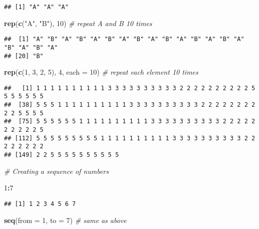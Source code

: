 \documentclass[
]{article}
\newenvironment{Shaded}{\begin{snugshade}}{\end{snugshade}}
\newcommand{\AttributeTok}[1]{\textcolor[rgb]{0.13,0.29,0.53}{#1}}
\newcommand{\CommentTok}[1]{\textcolor[rgb]{0.56,0.35,0.01}{\textit{#1}}}
\newcommand{\DecValTok}[1]{\textcolor[rgb]{0.00,0.00,0.81}{#1}}
\newcommand{\FunctionTok}[1]{\textcolor[rgb]{0.13,0.29,0.53}{\textbf{#1}}}
\newcommand{\NormalTok}[1]{#1}
\newcommand{\SpecialCharTok}[1]{\textcolor[rgb]{0.81,0.36,0.00}{\textbf{#1}}}
\newcommand{\StringTok}[1]{\textcolor[rgb]{0.31,0.60,0.02}{#1}}
\begin{document}
\begin{verbatim}
## [1] "A" "A" "A"
\end{verbatim}

\begin{Shaded}
\begin{Highlighting}[]
\FunctionTok{rep}\NormalTok{(}\FunctionTok{c}\NormalTok{(}\StringTok{"A"}\NormalTok{, }\StringTok{"B"}\NormalTok{), }\DecValTok{10}\NormalTok{) }\CommentTok{\# repeat A and B 10 times}
\end{Highlighting}
\end{Shaded}

\begin{verbatim}
##  [1] "A" "B" "A" "B" "A" "B" "A" "B" "A" "B" "A" "B" "A" "B" "A" "B" "A" "B" "A"
## [20] "B"
\end{verbatim}

\begin{Shaded}
\begin{Highlighting}[]
\FunctionTok{rep}\NormalTok{(}\FunctionTok{c}\NormalTok{(}\DecValTok{1}\NormalTok{, }\DecValTok{3}\NormalTok{, }\DecValTok{2}\NormalTok{, }\DecValTok{5}\NormalTok{), }\DecValTok{4}\NormalTok{, }\AttributeTok{each =} \DecValTok{10}\NormalTok{) }\CommentTok{\# repeat each element 10 times}
\end{Highlighting}
\end{Shaded}

\begin{verbatim}
##   [1] 1 1 1 1 1 1 1 1 1 1 3 3 3 3 3 3 3 3 3 3 2 2 2 2 2 2 2 2 2 2 5 5 5 5 5 5 5
##  [38] 5 5 5 1 1 1 1 1 1 1 1 1 1 3 3 3 3 3 3 3 3 3 3 2 2 2 2 2 2 2 2 2 2 5 5 5 5
##  [75] 5 5 5 5 5 5 1 1 1 1 1 1 1 1 1 1 3 3 3 3 3 3 3 3 3 3 2 2 2 2 2 2 2 2 2 2 5
## [112] 5 5 5 5 5 5 5 5 5 1 1 1 1 1 1 1 1 1 1 3 3 3 3 3 3 3 3 3 3 2 2 2 2 2 2 2 2
## [149] 2 2 5 5 5 5 5 5 5 5 5 5
\end{verbatim}

\begin{Shaded}
\begin{Highlighting}[]
\CommentTok{\# Creating a sequence of numbers}

\DecValTok{1}\SpecialCharTok{:}\DecValTok{7} 
\end{Highlighting}
\end{Shaded}

\begin{verbatim}
## [1] 1 2 3 4 5 6 7
\end{verbatim}

\begin{Shaded}
\begin{Highlighting}[]
\FunctionTok{seq}\NormalTok{(}\AttributeTok{from =} \DecValTok{1}\NormalTok{, }\AttributeTok{to =} \DecValTok{7}\NormalTok{) }\CommentTok{\# same as above}
\end{Highlighting}
\end{Shaded}
\end{document}

